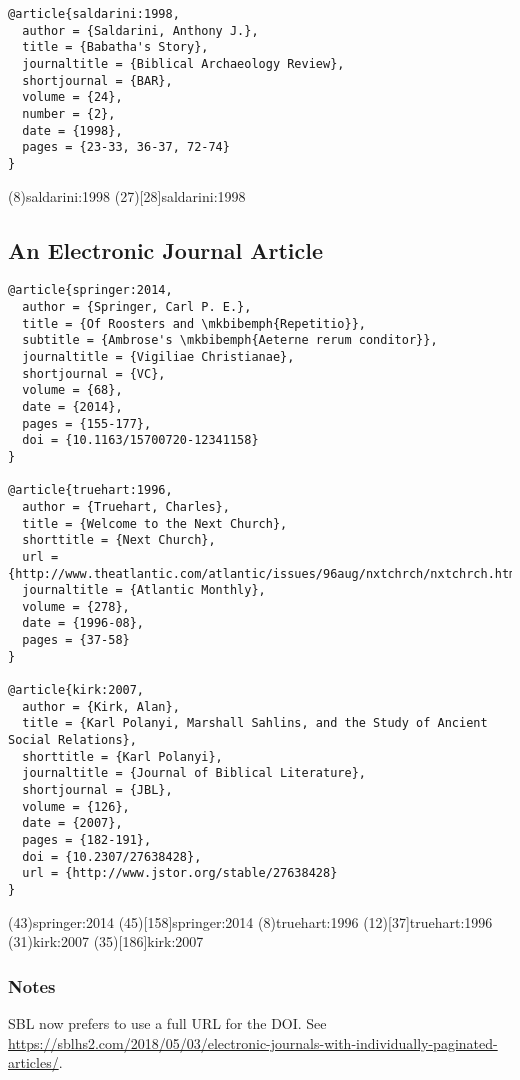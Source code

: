\documentclass[a4paper]{article}
\begin{document}
\begin{verbatim}
@article{saldarini:1998,
  author = {Saldarini, Anthony J.},
  title = {Babatha's Story},
  journaltitle = {Biblical Archaeology Review},
  shortjournal = {BAR},
  volume = {24},
  number = {2},
  date = {1998},
  pages = {23-33, 36-37, 72-74}
}
\end{verbatim}

\examplecite(8){saldarini:1998}
\examplecite(27)[28]{saldarini:1998}
\exampleabbreviations
\examplebibliography

\subsection{An Electronic Journal Article}

\begin{verbatim}
@article{springer:2014,
  author = {Springer, Carl P. E.},
  title = {Of Roosters and \mkbibemph{Repetitio}},
  subtitle = {Ambrose's \mkbibemph{Aeterne rerum conditor}},
  journaltitle = {Vigiliae Christianae},
  shortjournal = {VC},
  volume = {68},
  date = {2014},
  pages = {155-177},
  doi = {10.1163/15700720-12341158}
}

@article{truehart:1996,
  author = {Truehart, Charles},
  title = {Welcome to the Next Church},
  shorttitle = {Next Church},
  url = {http://www.theatlantic.com/atlantic/issues/96aug/nxtchrch/nxtchrch.htm},
  journaltitle = {Atlantic Monthly},
  volume = {278},
  date = {1996-08},
  pages = {37-58}
}

@article{kirk:2007,
  author = {Kirk, Alan},
  title = {Karl Polanyi, Marshall Sahlins, and the Study of Ancient Social Relations},
  shorttitle = {Karl Polanyi},
  journaltitle = {Journal of Biblical Literature},
  shortjournal = {JBL},
  volume = {126},
  date = {2007},
  pages = {182-191},
  doi = {10.2307/27638428},
  url = {http://www.jstor.org/stable/27638428}
}
\end{verbatim}

\examplecite(43){springer:2014}
\examplecite(45)[158]{springer:2014}
\examplecite(8){truehart:1996}
\examplecite(12)[37]{truehart:1996}
\examplecite(31){kirk:2007}
\examplecite(35)[186]{kirk:2007}
\exampleabbreviations
\examplebibliography

\subsubsection{Notes}

SBL now prefers to use a full URL for the DOI. See
\url{https://sblhs2.com/2018/05/03/electronic-journals-with-individually-paginated-articles/}.
\end{document}

